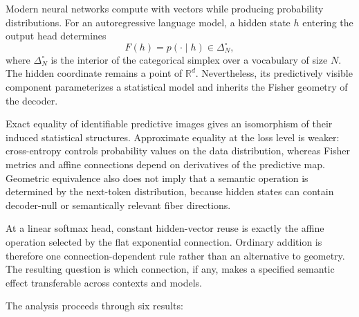 \documentclass[11pt]{article}
\theoremstyle{definition}
\theoremstyle{remark}
\newcommand{\simplex}{\Delta_{N}^{\circ}}
\newcommand{\R}{\mathbb{R}}
\begin{document}
Modern neural networks compute with vectors while producing probability distributions. For an autoregressive language model, a hidden state $h$ entering the output head determines
\begin{equation}
    F(h)=p(\cdot\mid h)\in\simplex,
\end{equation}
where $\simplex$ is the interior of the categorical simplex over a vocabulary of size $N$. The hidden coordinate remains a point of $\R^d$. Nevertheless, its predictively visible component parameterizes a statistical model and inherits the Fisher geometry of the decoder.

Exact equality of identifiable predictive images gives an isomorphism of their induced statistical structures. Approximate equality at the loss level is weaker: cross-entropy controls probability values on the data distribution, whereas Fisher metrics and affine connections depend on derivatives of the predictive map. Geometric equivalence also does not imply that a semantic operation is determined by the next-token distribution, because hidden states can contain decoder-null or semantically relevant fiber directions.

At a linear softmax head, constant hidden-vector reuse is exactly the affine operation selected by the flat exponential connection. Ordinary addition is therefore one connection-dependent rule rather than an alternative to geometry. The resulting question is which connection, if any, makes a specified semantic effect transferable across contexts and models.

The analysis proceeds through six results:
\end{document}
